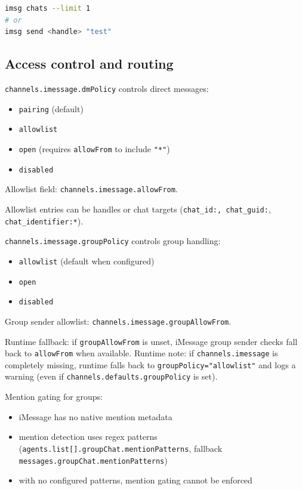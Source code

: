 \begin{lstlisting}[language=bash]
imsg chats --limit 1
# or
imsg send <handle> "test"
\end{lstlisting}



\subsection{Access control and routing}


\texttt{channels.imessage.dmPolicy} controls direct messages:

\begin{itemize}
  \item \texttt{pairing} (default)
  \item \texttt{allowlist}
  \item \texttt{open} (requires \texttt{allowFrom} to include \texttt{"*"})
  \item \texttt{disabled}
\end{itemize}


Allowlist field: \texttt{channels.imessage.allowFrom}.

Allowlist entries can be handles or chat targets (\texttt{chat\_id:\textit{}, \texttt{chat\_guid:}}, \texttt{chat\_identifier:*}).


\texttt{channels.imessage.groupPolicy} controls group handling:

\begin{itemize}
  \item \texttt{allowlist} (default when configured)
  \item \texttt{open}
  \item \texttt{disabled}
\end{itemize}


Group sender allowlist: \texttt{channels.imessage.groupAllowFrom}.

Runtime fallback: if \texttt{groupAllowFrom} is unset, iMessage group sender checks fall back to \texttt{allowFrom} when available.
Runtime note: if \texttt{channels.imessage} is completely missing, runtime falls back to \texttt{groupPolicy="allowlist"} and logs a warning (even if \texttt{channels.defaults.groupPolicy} is set).

Mention gating for groups:

\begin{itemize}
  \item iMessage has no native mention metadata
  \item mention detection uses regex patterns (\texttt{agents.list[].groupChat.mentionPatterns}, fallback \texttt{messages.groupChat.mentionPatterns})
  \item with no configured patterns, mention gating cannot be enforced
\end{itemize}


